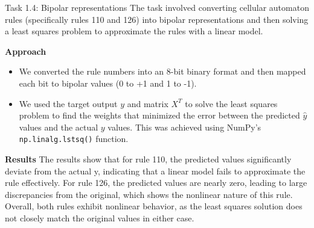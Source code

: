 \documentclass[aspectratio=169]{beamer}
\begin{document}
\begin{frame}{Task 1.4: Bipolar representations}
The task involved converting cellular automaton rules (specifically rules 110 and 126) into bipolar representations and then solving a least squares problem to approximate the rules with a linear model.

{\footnotesize
\vspace{1em}
\textbf{Approach}
\begin{itemize}
    \item We converted the rule numbers into an 8-bit binary format and then mapped each bit to bipolar values (0 to +1 and 1 to -1).
    \item {We used the target output \( y \) and matrix \( X^T \) to solve the least squares problem to find the weights that minimized the error between the predicted \( \hat{y} \) values and the actual \( y \) values. This was achieved using NumPy's \texttt{np.linalg.lstsq()} function.}
\end{itemize}

\textbf{Results}
The results show that for rule 110, the predicted values significantly deviate from the actual y, indicating that a linear model fails to approximate the rule effectively. For rule 126, the predicted values are nearly zero, leading to large discrepancies from the original, which shows the nonlinear nature of this rule.
Overall, both rules exhibit nonlinear behavior, as the least squares solution does not closely match the original values in either case.
}
\end{frame}
\end{document}
